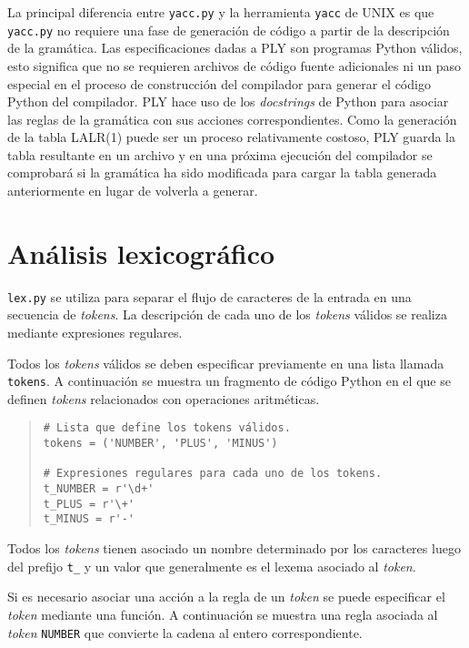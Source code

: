 \documentclass{article}
\begin{document}
La principal diferencia entre \texttt{yacc.py} y la herramienta \texttt{yacc}
de UNIX es que \texttt{yacc.py} no requiere una fase de generación de código a
partir de la descripción de la gramática. Las especificaciones dadas a PLY son
programas Python válidos, esto significa que no se requieren archivos de código
fuente adicionales ni un paso especial en el proceso de construcción del
compilador para generar el código Python del compilador. PLY hace uso de los
\emph{docstrings} de Python para asociar las reglas de la gramática con sus
acciones correspondientes. Como la generación de la tabla LALR(1) puede ser un
proceso relativamente costoso, PLY guarda la tabla resultante en un archivo y en 
una próxima ejecución del compilador se comprobará si la gramática ha sido
modificada para cargar la tabla generada anteriormente en lugar de volverla a
generar.

\section{Análisis lexicográfico}

\texttt{lex.py} se utiliza para separar el flujo de caracteres de la entrada en
una secuencia de \textit{tokens}. La descripción de cada uno de los
\textit{tokens} válidos se realiza mediante expresiones regulares.

Todos los \textit{tokens} válidos se deben especificar previamente en una lista
llamada \texttt{tokens}. A continuación se muestra un fragmento de código
Python en el que se definen \textit{tokens} relacionados con operaciones
aritméticas.

\begin{quote}
\begin{verbatim}
# Lista que define los tokens válidos.
tokens = ('NUMBER', 'PLUS', 'MINUS')

# Expresiones regulares para cada uno de los tokens.
t_NUMBER = r'\d+'
t_PLUS = r'\+'
t_MINUS = r'-'
\end{verbatim}
\end{quote}

Todos los \textit{tokens} tienen asociado un nombre determinado por los
caracteres luego del prefijo \texttt{t\_} y un valor que generalmente es el
lexema asociado al \textit{token}.

Si es necesario asociar una acción a la regla de un \textit{token} se puede
especificar el \textit{token} mediante una función. A continuación se muestra
una regla asociada al \textit{token} \texttt{NUMBER} que convierte la cadena al
entero correspondiente.
\end{document}
